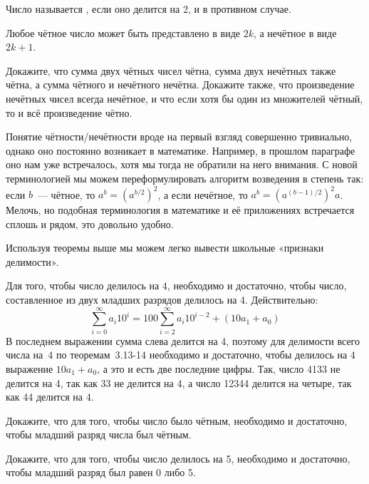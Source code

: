 \begin{definition}
Число называется , если оно делится на 2, и  в противном случае.
\end{definition}

Любое чётное число может быть представлено в виде $2k$, а нечётное в виде $2k+1$.

\begin{exercise}
Докажите, что сумма двух чётных чисел чётна, сумма двух нечётных также чётна, а сумма чётного и нечётного нечётна. Докажите также, что произведение нечётных чисел всегда нечётное, и что если хотя бы один из множителей чётный, то и всё произведение чётно.
\end{exercise}

Понятие чётности/нечётности вроде на первый взгляд совершенно тривиально, однако оно постоянно возникает в математике. Например, в прошлом параграфе оно нам уже встречалось, хотя мы тогда не обратили на него внимания. С новой терминологией мы можем переформулировать алгоритм возведения в степень так: если $b$~— чётное, то $a^b = (a^{b/2})^2$, а если нечётное, то $a^b = (a^{(b-1)/2})^2 a$. Мелочь, но подобная терминология в математике и её приложениях встречается сплошь и рядом, это довольно удобно.

Используя теоремы выше мы можем легко вывести школьные «признаки делимости».

\begin{example}
Для того, чтобы число делилось на 4, необходимо и достаточно, чтобы число, составленное из двух младших разрядов делилось на 4. Действительно:
$$\sum_{i=0}^\infty a_i 10^i = 100 \sum_{i = 2}^\infty a_i 10^{i-2} + (10a_1 + a_0)$$
В последнем выражении сумма слева делится на 4, поэтому для делимости всего числа на~4 по теоремам~3.13-14 необходимо и достаточно, чтобы делилось на 4 выражение $10a_1 + a_0$, а это и есть две последние цифры. Так, число 4133 не делится на 4, так как 33 не делится на 4, а число 12344 делится на четыре, так как 44 делится на 4.
\end{example}

\begin{exercise}
Докажите, что для того, чтобы число было чётным, необходимо и достаточно, чтобы младший разряд числа был чётным.
\end{exercise}

\begin{exercise}
Докажите, что для того, чтобы число делилось на 5, необходимо и достаточно, чтобы младший разряд был равен 0 либо 5.
\end{exercise}

